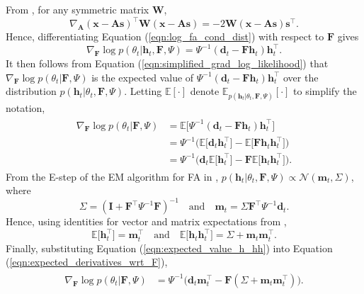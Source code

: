 \documentclass[msc,deptreport.inf]{infthesis} %
\newcommand{\matr}[1]{\mathbf{#1}}
\newcommand{\E}{\mathbb E}
\begin{document}
From \cite{petersen2012}, for any symmetric matrix $\matr{W}$,
\begin{equation}
	\nabla_{\matr{A}} (\matr{x} - \matr{As})^\intercal \matr{W} (\matr{x} - \matr{As}) = -2 \matr{W} (\matr{x} - \matr{As}) \matr{s}^\intercal.
\end{equation}
Hence, differentiating Equation (\ref{eqn:log_fa_cond_dist}) with respect to $\matr{F}$ gives
\begin{equation}
	\nabla_{\matr{F}} \log p(\theta_t | \matr{h}_t, \matr{F}, \Psi)
	= \Psi^{-1} (\matr{d}_t - \matr{Fh}_t) \matr{h}_t^\intercal.
\end{equation}
It then follows from Equation (\ref{eqn:simplified_grad_log_likelihood}) that $\nabla_{\matr{F}} \log p(\theta_t | \matr{F}, \Psi)$ is the expected value of $\Psi^{-1} (\matr{d}_t - \matr{Fh}_t) \matr{h}_t^\intercal$ over the distribution $p(\matr{h}_t | \theta_t, \matr{F}, \Psi)$. Letting $\E[\cdot]$ denote $\E_{p(\matr{h}_t | \theta_t, \matr{F}, \Psi)}[\cdot]$ to simplify the notation, 
\begin{align}\label{eqn:expected_derivatives_wrt_F}
\begin{split}
	\nabla_{\matr{F}} \log p(\theta_t | \matr{F}, \Psi) 
	& = \E \big[ \Psi^{-1} (\matr{d}_t - \matr{Fh}_t) \matr{h}_t^\intercal \big] \\
	& = \Psi^{-1} \big(\E \big[ \matr{d}_t \matr{h}_t^\intercal \big] 
	- \E \big[ \matr{Fh}_t \matr{h}_t^\intercal \big] \big) \\
	& = \Psi^{-1}\big( \matr{d}_t \E \big[ \matr{h}_t^\intercal \big] 
	- \matr{F}  \E \big[ \matr{h}_t \matr{h}_t^\intercal \big]\big).
\end{split}
\end{align} 
From the E-step of the EM algorithm for FA in \cite{barber2007}, $p(\matr{h}_t | \theta_t, \matr{F}, \Psi) \propto \mathcal{N}(\matr{m}_t, \Sigma)$, where
\begin{equation}\label{eqn:variational_params}
	\Sigma = (\matr{I} + \matr{F}^\intercal \Psi^{-1} \matr{F})^{-1}
	\quad \text{and} \quad \matr{m}_t = \Sigma \matr{F}^\intercal \Psi^{-1} \matr{d}_t.
\end{equation}
Hence, using identities for vector and matrix expectations from \cite{petersen2012}, 
\begin{equation}\label{eqn:expected_value_h_hh}
	\E \big[ \matr{h}_t^\intercal \big] = \matr{m}_t^\intercal \quad \text{and} \quad \E \big[ \matr{h}_t \matr{h}_t^\intercal \big] = \Sigma + \matr{m}_t \matr{m}_t^\intercal.
\end{equation}
Finally, substituting Equation (\ref{eqn:expected_value_h_hh}) into Equation (\ref{eqn:expected_derivatives_wrt_F}), 
\begin{align}\label{eqn:derivatives_wrt_F}
\begin{split}
	\nabla_{\matr{F}} \log p(\theta_t | \matr{F}, \Psi) 
	& = \Psi^{-1} \big(\matr{d}_t \matr{m}_t^\intercal - \matr{F}  (\Sigma + \matr{m}_t \matr{m}_t^\intercal)\big).
\end{split}
\end{align} 
\end{document}
